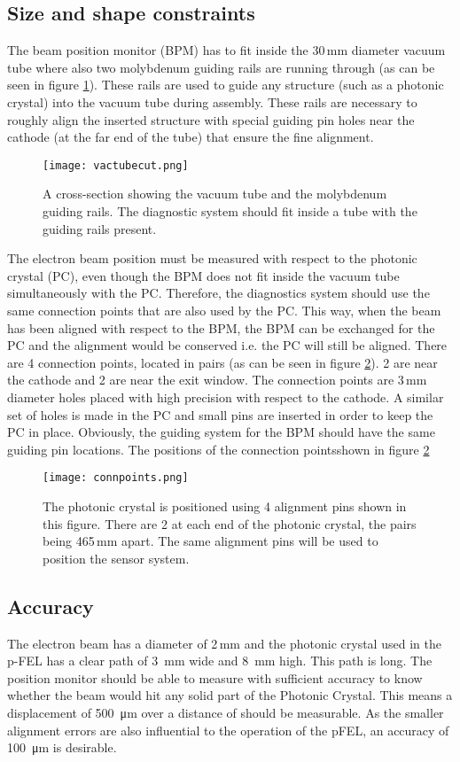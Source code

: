 \subsection{Size and shape constraints}
\label{sec:design/sizeshape}
The beam position monitor (BPM) has to fit inside the 30\,mm diameter vacuum tube where also two molybdenum guiding rails are running through (as can be seen in figure \ref{fig:vacuumtube}). These rails are used to guide any structure (such as a photonic crystal) into the vacuum tube during assembly. These rails are necessary to roughly align the inserted structure with special guiding pin holes near the cathode (at the far end of the tube) that ensure the fine alignment.
\begin{figure}[h]
 \centering
 \texttt{[image: vactubecut.png]}
 \caption{A cross-section showing the vacuum tube and the molybdenum guiding rails. The diagnostic system should fit inside a tube with the guiding rails present.}
 \label{fig:vacuumtube}
\end{figure}

The electron beam position must be measured with respect to the photonic crystal (PC), even though the BPM does not fit inside the vacuum tube simultaneously with the PC. Therefore, the diagnostics system should use the same connection points that are also used by the PC. This way, when the beam has been aligned with respect to the BPM, the BPM can be exchanged for the PC and the alignment would be conserved i.e. the PC will still be aligned. 
There are 4 connection points, located in pairs (as can be seen in figure \ref{fig:connpoints}). 2 are near the cathode and 2 are near the exit window. The connection points are 3\,mm diameter holes placed with high precision with respect to the cathode. A similar set of holes is made in the PC and small pins are inserted in order to keep the PC in place.
Obviously, the guiding system for the BPM should have the same guiding pin locations.
The positions of the connection pointsshown in figure \ref{fig:connpoints}
\begin{figure}[H]
 \centering
 \texttt{[image: connpoints.png]}
 \caption{The photonic crystal is positioned using 4 alignment pins shown in this figure. There are 2 at each end of the photonic crystal, the pairs being 465\,mm apart. The same alignment pins will be used to position the sensor system.}
 \label{fig:connpoints}
\end{figure}

\subsection{Accuracy}
The electron beam has a diameter of 2\,mm and the photonic crystal used in the p-FEL has a clear path of \SI{3}{\milli\meter} wide and \SI{8}{\milli\meter} high. This path is  long. The position monitor should be able to measure with sufficient accuracy to know whether the beam would hit any solid part of the Photonic Crystal. This means a displacement of \SI{500}{\micro\meter} over a distance of  should be measurable. As the smaller alignment errors are also influential to the operation of the pFEL,  an accuracy of \SI{100}{\micro\meter} is desirable.

